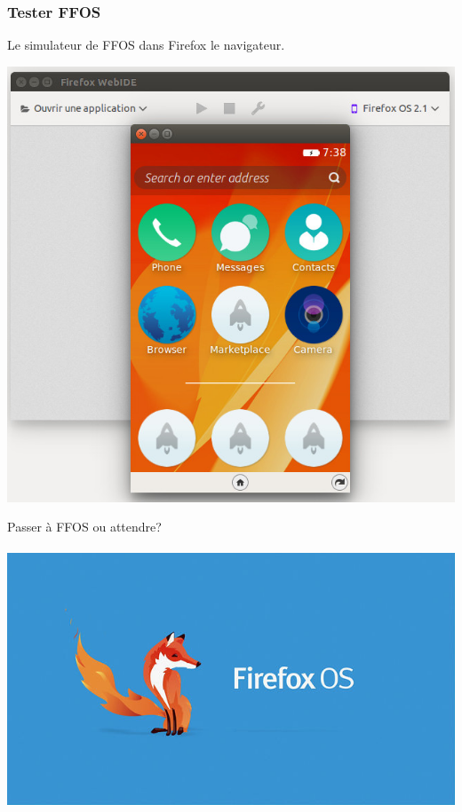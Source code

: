 \documentclass{beamer}
\begin{document}
\begin{frame}
\frametitle{Tester FFOS}
Le simulateur de FFOS dans Firefox le navigateur. 

\begin{center}
\includegraphics[scale=0.3]{./images/ffos_simulator.jpg}
\end{center}
\end{frame}

\begin{frame}
\begin{center}
\Huge{Passer à FFOS ou attendre?}
\\~\\
\includegraphics[scale=0.3]{./images/firefox-os.jpg}
\end{center}
\end{frame}
\end{document}
